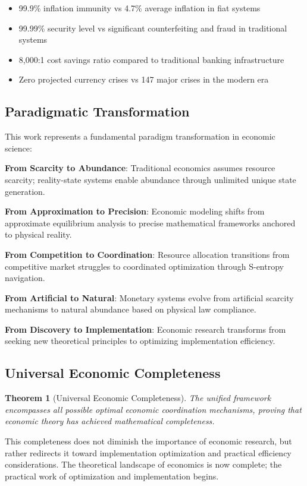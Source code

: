 \documentclass[12pt,a4paper]{article}
\newtheorem{theorem}{Theorem}
\begin{document}
\begin{itemize}
\item 99.9\% inflation immunity vs 4.7\% average inflation in fiat systems
\item 99.99\% security level vs significant counterfeiting and fraud in traditional systems
\item 8,000:1 cost savings ratio compared to traditional banking infrastructure
\item Zero projected currency crises vs 147 major crises in the modern era
\end{itemize}

\subsection{Paradigmatic Transformation}

This work represents a fundamental paradigm transformation in economic science:

\textbf{From Scarcity to Abundance}: Traditional economics assumes resource scarcity; reality-state systems enable abundance through unlimited unique state generation.

\textbf{From Approximation to Precision}: Economic modeling shifts from approximate equilibrium analysis to precise mathematical frameworks anchored to physical reality.

\textbf{From Competition to Coordination}: Resource allocation transitions from competitive market struggles to coordinated optimization through S-entropy navigation.

\textbf{From Artificial to Natural}: Monetary systems evolve from artificial scarcity mechanisms to natural abundance based on physical law compliance.

\textbf{From Discovery to Implementation}: Economic research transforms from seeking new theoretical principles to optimizing implementation efficiency.

\subsection{Universal Economic Completeness}

\begin{theorem}[Universal Economic Completeness]
The unified framework encompasses all possible optimal economic coordination mechanisms, proving that economic theory has achieved mathematical completeness.
\end{theorem}

This completeness does not diminish the importance of economic research, but rather redirects it toward implementation optimization and practical efficiency considerations. The theoretical landscape of economics is now complete; the practical work of optimization and implementation begins.
\end{document}
